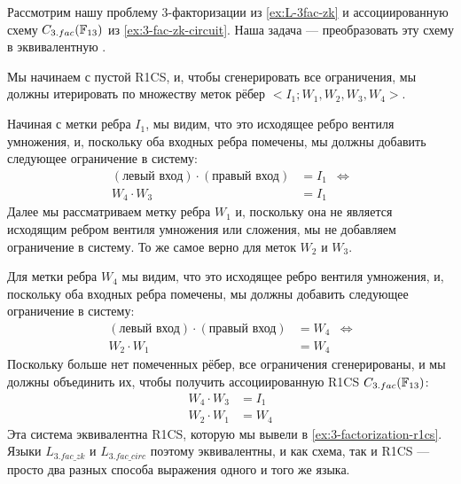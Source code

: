 \begin{example}[$3$-factorization] Рассмотрим нашу проблему $3$-факторизации из \examplename{} \ref{ex:L-3fac-zk} и ассоциированную схему $C_{3.fac}(\mathbb{F}_{13})$ из \examplename{} \ref{ex:3-fac-zk-circuit}. Наша задача — преобразовать эту схему в эквивалентную .
\begin{center}
\end{center}
Мы начинаем с пустой R1CS, и, чтобы сгенерировать все ограничения, мы должны итерировать по множеству меток рёбер $<I_1;W_1,W_2,W_3,W_4>$.  

Начиная с метки ребра $I_1$, мы видим, что это исходящее ребро вентиля умножения, и, поскольку оба входных ребра помечены, мы должны добавить следующее ограничение в систему:
\begin{align*}
(\text{левый вход})\cdot (\text{правый вход})  &= I_1 & \Leftrightarrow\\
W_4\cdot W_3  &= I_1
\end{align*}
Далее мы рассматриваем метку ребра $W_1$ и, поскольку она не является исходящим ребром вентиля умножения или сложения, мы не добавляем ограничение в систему. То же самое верно для меток $W_2$ и $W_3$.

Для метки ребра $W_4$ мы видим, что это исходящее ребро вентиля умножения, и, поскольку оба входных ребра помечены, мы должны добавить следующее ограничение в систему:
\begin{align*}
(\text{левый вход})\cdot (\text{правый вход})  &= W_4 & \Leftrightarrow\\
W_2\cdot W_1  &= W_4
\end{align*} 
Поскольку больше нет помеченных рёбер, все ограничения сгенерированы, и мы должны объединить их, чтобы получить ассоциированную R1CS $C_{3.fac}(\mathbb{F}_{13})$:
\begin{align*}
 W_4\cdot W_3 & = I_1\\
 W_2\cdot W_1 & = W_4
\end{align*}
Эта система эквивалентна R1CS, которую мы вывели в \examplename{} \ref{ex:3-factorization-r1cs}. Языки $L_{3.fac\_zk}$ и $L_{3.fac\_circ}$ поэтому эквивалентны, и как схема, так и R1CS — просто два разных способа выражения одного и того же языка.
\end{example}
